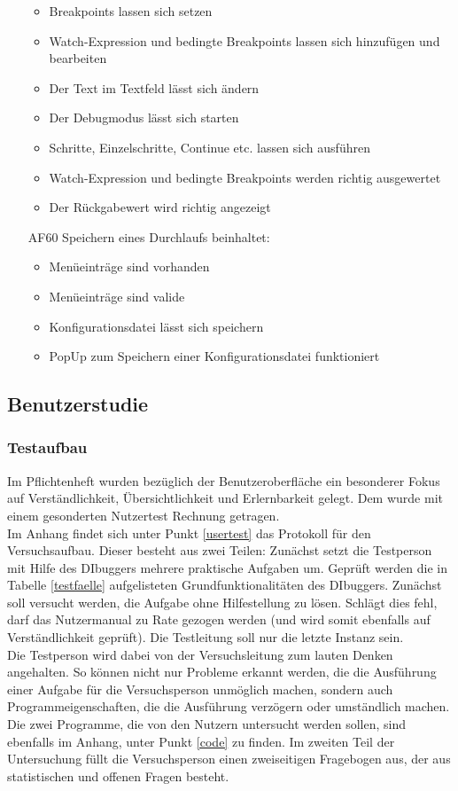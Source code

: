 \documentclass[parskip=full]{scrartcl}
\begin{document}
\begin{itemize}
\begin{itemize}
		\item Breakpoints lassen sich setzen
		\item Watch-Expression und bedingte Breakpoints lassen sich hinzufügen und bearbeiten
		\item Der Text im Textfeld lässt sich ändern
		\item Der Debugmodus lässt sich starten
		\item Schritte, Einzelschritte, Continue etc. lassen sich ausführen
		\item Watch-Expression und bedingte Breakpoints werden richtig ausgewertet
		\item Der Rückgabewert wird richtig angezeigt
	\end{itemize}
	\item[AF60] Speichern eines Durchlaufs beinhaltet:
	\begin{itemize}
		\item Menüeinträge sind vorhanden
		\item Menüeinträge sind valide
		\item Konfigurationsdatei lässt sich speichern
		\item PopUp zum Speichern einer Konfigurationsdatei funktioniert
	\end{itemize}
\end{itemize}

\subsection{Benutzerstudie}\label{usertestimdoc}

\subsubsection{Testaufbau}

Im Pflichtenheft wurden bezüglich der Benutzeroberfläche ein besonderer Fokus auf Verständlichkeit, Übersichtlichkeit und Erlernbarkeit gelegt. Dem wurde mit einem gesonderten Nutzertest Rechnung getragen. \\
Im Anhang findet sich unter Punkt \ref{usertest} das Protokoll für den Versuchsaufbau. Dieser besteht aus zwei Teilen: Zunächst setzt die Testperson mit Hilfe des DIbuggers mehrere praktische Aufgaben um. Geprüft werden die in Tabelle \ref{testfaelle} aufgelisteten Grundfunktionalitäten des DIbuggers. Zunächst soll versucht werden, die Aufgabe ohne Hilfestellung zu lösen. Schlägt dies fehl, darf das Nutzermanual zu Rate gezogen werden (und wird somit ebenfalls auf Verständlichkeit geprüft). Die Testleitung soll nur die letzte Instanz sein. \\
Die Testperson wird dabei von der Versuchsleitung zum lauten Denken angehalten. So können nicht nur Probleme erkannt werden, die die Ausführung einer Aufgabe für die Versuchsperson unmöglich machen, sondern auch Programmeigenschaften, die die Ausführung verzögern oder umständlich machen. \\
Die zwei Programme, die von den Nutzern untersucht werden sollen, sind ebenfalls im Anhang, unter Punkt \ref{code} zu finden.
Im zweiten Teil der Untersuchung füllt die Versuchsperson einen zweiseitigen Fragebogen aus, der aus statistischen und offenen Fragen besteht.
\end{document}
